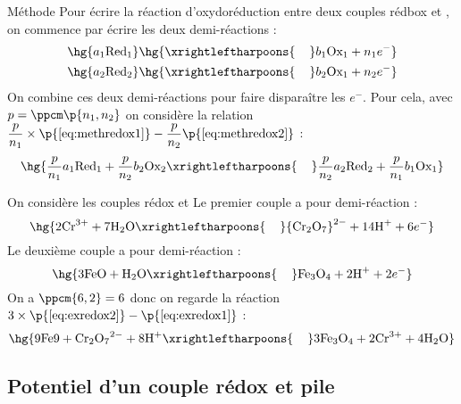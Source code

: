     \begin{form}{Méthode}{}
        Pour écrire la réaction d'oxydoréduction entre deux couples rédbox  et , on commence par écrire les deux demi-réactions :
        \begin{align}
            \label{eq:methredox1}\hg{a_1\text{Red}_1} &\hg{\xrightleftharpoons{\hspace{0.4cm}} b_1\text{Ox}_1 + n_1e^-}\\
            \label{eq:methredox2}\hg{a_2\text{Red}_2} &\hg{\xrightleftharpoons{\hspace{0.4cm}} b_2\text{Ox}_1 + n_2e^-}
        \end{align}
        On combine ces deux demi-réactions pour faire disparaître les $e^-$. Pour cela, avec $p = \ppcm\p{n_1, n_2}$ on considère la relation $\dfrac{p}{n_1}\times\p{\ref{eq:methredox1}} - \dfrac{p}{n_2}\p{\ref{eq:methredox2}}$ :
        \[ \hg{\dfrac{p}{n_1}a_1\text{Red}_1 + \dfrac{p}{n_2}b_2\text{Ox}_2 \xrightleftharpoons{\hspace{0.4cm}} \dfrac{p}{n_2}a_2\text{Red}_2 + \dfrac{p}{n_1}b_1\text{Ox}_1} \]
    \end{form}
    \begin{example}{}{}
        On considère les couples rédox  et 
        Le premier couple a pour demi-réaction :
        \begin{equation}
            \label{eq:exredox1}\hg{2\text{Cr}^{3+} + 7\text H_2\text O \xrightleftharpoons{\hspace{0.4cm}} {\text{Cr}_2\text O_7}^{2-} + 14\text H^+ + 6e^-}
        \end{equation}
        Le deuxième couple a pour demi-réaction :
        \begin{equation}
            \label{eq:exredox2}\hg{3\text{FeO} + \text H_2\text O \xrightleftharpoons{\hspace{0.4cm}} \text{Fe}_3\text O_4 + 2\text H^+ + 2e^-}
        \end{equation}
        On a $\ppcm{6, 2} = 6$ donc on regarde la réaction $3\times\p{\ref{eq:exredox2}} - \p{\ref{eq:exredox1}}$ :
        \[ \hg{9\text{Fe9} + {\text{Cr}_2\text O_7}^{2-} + 8\text H^+ \xrightleftharpoons{\hspace{0.4cm}} 3\text{Fe}_3\text O_4 + 2\text{Cr}^{3+} + 4\text H_2\text O}\]
    \end{example}
    
    \subsection{Potentiel d'un couple rédox et pile}